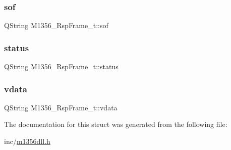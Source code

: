 \subsubsection{\texorpdfstring{sof}{sof}}
{\footnotesize\ttfamily Q\+String M1356\+\_\+\+Rsp\+Frame\+\_\+t\+::sof}

\mbox{\label{struct_m1356___rsp_frame__t_a8a97971b3dadcb42f1f9ca0c7a0148de}} 
\subsubsection{\texorpdfstring{status}{status}}
{\footnotesize\ttfamily Q\+String M1356\+\_\+\+Rsp\+Frame\+\_\+t\+::status}

\mbox{\label{struct_m1356___rsp_frame__t_aebced86ccafc1bd99e72bce2dcc0d6c4}} 
\subsubsection{\texorpdfstring{vdata}{vdata}}
{\footnotesize\ttfamily Q\+String M1356\+\_\+\+Rsp\+Frame\+\_\+t\+::vdata}



The documentation for this struct was generated from the following file\+:\begin{DoxyCompactItemize}
\item 
inc/\mbox{\hyperlink{m1356dll_8h}{m1356dll.\+h}}\end{DoxyCompactItemize}
